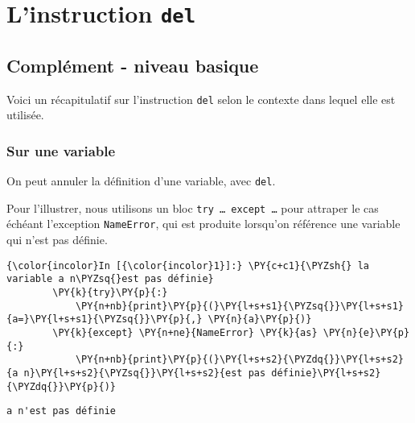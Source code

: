     
    
    
    

    

    \hypertarget{linstruction-del}{%
\section{\texorpdfstring{L'instruction
\texttt{del}}{L'instruction del}}\label{linstruction-del}}

    \hypertarget{compluxe9ment---niveau-basique}{%
\subsection{Complément - niveau
basique}\label{compluxe9ment---niveau-basique}}

    Voici un récapitulatif sur l'instruction \texttt{del} selon le contexte
dans lequel elle est utilisée.

    \hypertarget{sur-une-variable}{%
\subsubsection{Sur une variable}\label{sur-une-variable}}

    On peut annuler la définition d'une variable, avec \texttt{del}.

Pour l'illustrer, nous utilisons un bloc
\texttt{try\ \ldots{}\ except\ \ldots{}} pour attraper le cas échéant
l'exception \texttt{NameError}, qui est produite lorsqu'on référence une
variable qui n'est pas définie.

    \begin{Verbatim}[commandchars=\\\{\}]
{\color{incolor}In [{\color{incolor}1}]:} \PY{c+c1}{\PYZsh{} la variable a n\PYZsq{}est pas définie}
        \PY{k}{try}\PY{p}{:}
            \PY{n+nb}{print}\PY{p}{(}\PY{l+s+s1}{\PYZsq{}}\PY{l+s+s1}{a=}\PY{l+s+s1}{\PYZsq{}}\PY{p}{,} \PY{n}{a}\PY{p}{)}
        \PY{k}{except} \PY{n+ne}{NameError} \PY{k}{as} \PY{n}{e}\PY{p}{:}
            \PY{n+nb}{print}\PY{p}{(}\PY{l+s+s2}{\PYZdq{}}\PY{l+s+s2}{a n}\PY{l+s+s2}{\PYZsq{}}\PY{l+s+s2}{est pas définie}\PY{l+s+s2}{\PYZdq{}}\PY{p}{)}
\end{Verbatim}


    \begin{Verbatim}[commandchars=\\\{\}]
a n'est pas définie

    \end{Verbatim}

